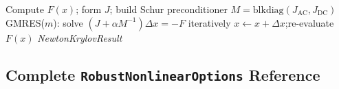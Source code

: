 \begin{algorithmic}[1]
  \State Compute $F(x)$; form $J$; build Schur preconditioner $M = \mathrm{blkdiag}(J_{\mathrm{AC}}, J_{\mathrm{DC}})$
    \State GMRES($m$): solve $(J + \alpha M^{-1})\Delta x = -F$ iteratively
    \State $x \gets x + \Delta x$;\quad re-evaluate $F(x)$
  \EndWhile
  \State \Return \textit{NewtonKrylovResult}
\EndProcedure
\end{algorithmic}

\subsection{Complete \texttt{RobustNonlinearOptions} Reference}
\label{sec:robust-options-table}

